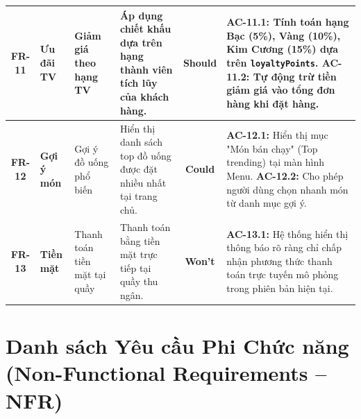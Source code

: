 \documentclass[12pt,a4paper]{article}
\begin{document}
\begin{xltabular}{\textwidth}{|c|>{\raggedright\arraybackslash}p{1.8cm}|>{\raggedright\arraybackslash}p{2.6cm}|>{\raggedright\arraybackslash}p{3cm}|c|>{\raggedright\arraybackslash}X|}
\hline
\textbf{FR-11} & \textbf{Ưu đãi TV} & Giảm giá theo hạng TV & Áp dụng chiết khấu dựa trên hạng thành viên tích lũy của khách hàng. & \textbf{Should} & 
\textbf{AC-11.1:} Tính toán hạng Bạc (5\%), Vàng (10\%), Kim Cương (15\%) dựa trên \texttt{loyaltyPoints}.\newline
\textbf{AC-11.2:} Tự động trừ tiền giảm giá vào tổng đơn hàng khi đặt hàng. \\
\hline
\textbf{FR-12} & \textbf{Gợi ý món} & Gợi ý đồ uống phổ biến & Hiển thị danh sách top đồ uống được đặt nhiều nhất tại trang chủ. & \textbf{Could} & 
\textbf{AC-12.1:} Hiển thị mục "Món bán chạy" (Top trending) tại màn hình Menu.\newline
\textbf{AC-12.2:} Cho phép người dùng chọn nhanh món từ danh mục gợi ý. \\
\hline
\textbf{FR-13} & \textbf{Tiền mặt} & Thanh toán tiền mặt tại quầy & Thanh toán bằng tiền mặt trực tiếp tại quầy thu ngân. & \textbf{Won't} & 
\textbf{AC-13.1:} Hệ thống hiển thị thông báo rõ ràng chỉ chấp nhận phương thức thanh toán trực tuyến mô phỏng trong phiên bản hiện tại. \\
\end{xltabular}

\section{Danh sách Yêu cầu Phi Chức năng (Non-Functional Requirements -- NFR)}
\end{document}
